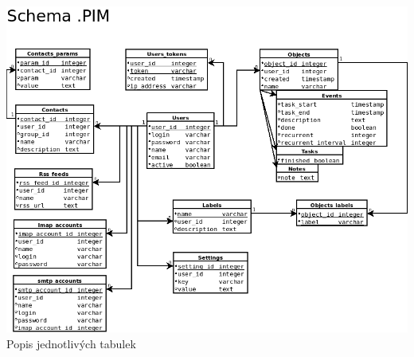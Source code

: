 \documentclass[bc,male,html,dept460]{diploma}				%
\begin{document}
\bigskip
\includegraphics[width=\textwidth]{../structure.png} 
\newpage
Popis jednotlivých tabulek
\end{document}
